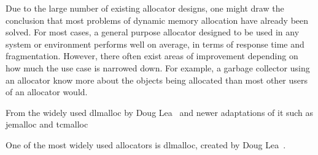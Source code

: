 

Due to the large number of existing allocator designs, one might draw the conclusion that most problems of dynamic memory allocation have already been solved. For most cases, a general purpose allocator designed to be used in any system or environment performs well on average, in terms of response time and fragmentation. However, there often exist areas of improvement depending on how much the use case is narrowed down. For example, a garbage collector using an allocator know more about the objects being allocated than most other users of an allocator would.

From the widely used dlmalloc by Doug Lea~\cite{dlmalloc} and newer adaptations of it such as jemalloc and tcmalloc

One of the most widely used allocators is dlmalloc, created by Doug Lea~\cite{dlmalloc}. 

